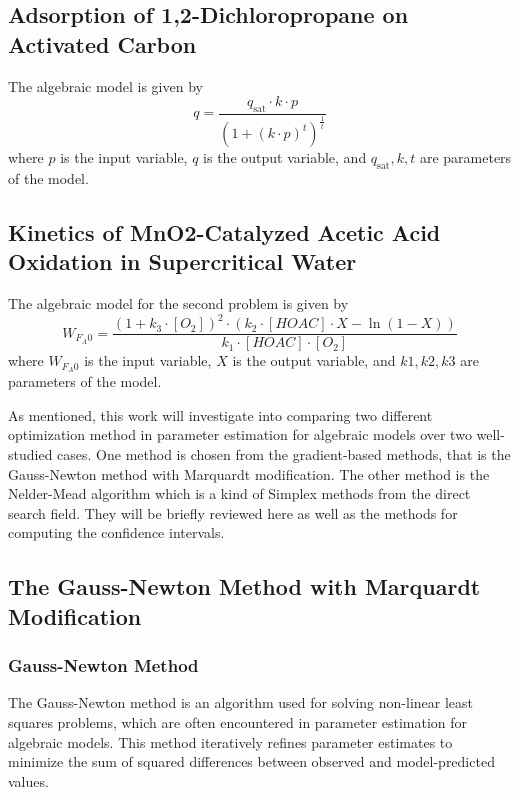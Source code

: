 \documentclass[12pt]{article} %
\begin{document}
\subsection{Adsorption of 1,2-Dichloropropane on Activated Carbon}
The algebraic model is given by
\begin{equation}
    q = \frac{q_{\text{sat}} \cdot k \cdot p}{(1 + (k \cdot p)^t)^{\frac{1}{t}}}
\end{equation}
where \( p \) is the input variable, \( q \) is the output variable, and \( q_{\text{sat}}, k, t \) are parameters of the model.
\subsection{Kinetics of MnO2-Catalyzed Acetic Acid Oxidation in Supercritical Water}
The algebraic model for the second problem is given by
\begin{equation}
    W_{F_A0} = \frac{(1 + k_3 \cdot [O_2])^2 \cdot (k_2 \cdot [HOAC] \cdot X - \ln(1-X))}{k_1 \cdot [HOAC] \cdot [O_2]}
\end{equation}
where \( W_{F_A0} \) is the input variable, \( X \) is the output variable, and \( k1, k2, k3 \) are parameters of the model.

As mentioned, this work will investigate into comparing two different optimization method in parameter estimation for algebraic models over two well-studied cases. One method is chosen from the gradient-based methods, that is the Gauss-Newton method with Marquardt modification. The other method is the Nelder-Mead algorithm which
is a kind of Simplex methods from the direct search field. They will be briefly reviewed here as well as the methods for computing the confidence intervals. 
\subsection{The Gauss-Newton Method with Marquardt Modification}

\subsubsection{Gauss-Newton Method}

The Gauss-Newton method is an algorithm used for solving non-linear least squares problems, which are often encountered in parameter estimation for algebraic models. This method iteratively refines parameter estimates to minimize the sum of squared differences between observed and model-predicted values.
\end{document}
